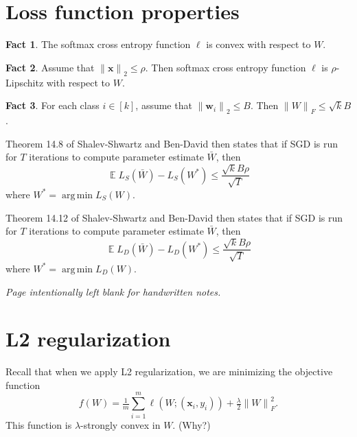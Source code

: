 \documentclass[10pt]{article}
\theoremstyle{definition}
\newtheorem{fact}{Fact}
\DeclareMathOperator{\E}{\mathbb E}
\DeclareMathOperator*{\argmin}{arg\,min}
\newcommand{\loss}{\ell}
\newcommand{\w}{\mathbf w}
\newcommand{\x}{\mathbf x}
\newcommand{\ltwo}[1]{{\lVert {#1} \rVert}_2}
\newcommand{\lF}[1]{{\lVert {#1} \rVert}_F}
\begin{document}
\newpage
\section{Loss function properties}

\begin{fact}
    The softmax cross entropy function $\loss$ is convex with respect to $W$.
\end{fact}

\begin{fact}
    Assume that $\ltwo{\x}\le \rho$.
    Then softmax cross entropy function $\loss$ is $\rho$-Lipschitz with respect to $W$.
\end{fact}

\begin{fact}
    For each class $i \in [k]$, assume that $\ltwo{\w_i} \le B$.
    Then $\lF{W} \le \sqrt kB$.
\end{fact}

\noindent
Theorem 14.8 of Shalev-Shwartz and Ben-David then states that if SGD is run for $T$ iterations to compute parameter estimate $\bar W$,
then
\begin{equation}
    \E L_S(\bar W) - L_S(W^*) \le \frac {\sqrt kB\rho}{\sqrt T}
\end{equation}
where $W^* = \argmin L_S(W)$.

Theorem 14.12 of Shalev-Shwartz and Ben-David then states that if SGD is run for $T$ iterations to compute parameter estimate $\bar W$,
then
\begin{equation}
    \E L_D(\bar W) - L_D(W^*) \le \frac {\sqrt kB\rho}{\sqrt T}
\end{equation}
where $W^* = \argmin L_D(W)$.

\newpage
\noindent\emph{Page intentionally left blank for handwritten notes.}
\newpage
\section{L2 regularization}

Recall that when we apply L2 regularization,
we are minimizing the objective function
\begin{equation}
    f(W) = \tfrac 1 m \sum_{i=1}^m \loss(W; (\x_i,y_i)) + \tfrac\lambda2\lF{W}^2
    .
\end{equation}
This function is $\lambda$-strongly convex in $W$.
(Why?)
\end{document}
